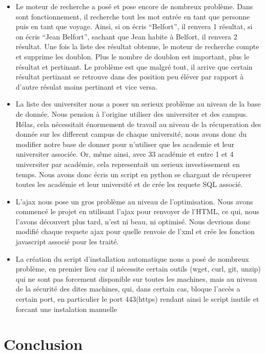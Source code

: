 \documentclass[a4paper,10pt]{report}
\begin{document}
\begin{itemize}
    \item Le moteur de recherche a pos\'e et pose encore de nombreux probl\`eme.
    Dans sont fonctionnement, il recherche tout les mot entr\'ee en tant que
    personne puis en tant que voyage. Ainsi, si on \'ecris ``Belfort'', il renvera 1 r\'esultat,
    si on \'ecris ``Jean Belfort'', sachant que Jean habite \`a Belfort, il renvera 2 r\'esultat.
    Une fois la liste des r\'esultat obtenue, le moteur de recherche compte et supprime
    les doublon. Plus le nombre de doublon est important, plus le r\'esultat et pertinant.
    Le probl\`eme est que malgr\'e tout, il arrive que certain r\'esultat pertinant se
    retrouve dans des position peu \'el\'ever par rapport \`a d'autre r\'esulat moins pertinant
    et vice versa.
    
    \null
    
    \item La liste des universiter nous a poser un serieux probl\`eme au niveau de la
    base de donn\'ee. Nous pension \`a l'origine utiliser des universiter et des campus.
    H\'elas, cela n\'ecessitait \'enormement de travail au niveau de la r\'ecuperation
    des donn\'ee sur les different campus de chaque universit\'e, nous avons donc du
    modifier notre base de donner pour n'utiliser que les academie et leur universiter
    associ\'ee. Or, m\^eme ainsi, avec 33 acad\'emie et entre 1 et 4 universiter par
    acad\'emie, cela representait un serieux investissement en temps. Nous avons donc
    \'ecris un script en python se chargant de r\'ecuperer toutes les acad\'emie et
    leur universit\'e et de cr\'ee les requete SQL associ\'e.
    
    \null
    
    \item L'ajax nous pose un gros probl\`eme au niveau de l'optimisation. Nous avons
    commenc\'e le projet en utilisant l'ajax pour renvoyer de l'HTML, ce qui, nous l'avons
    d\'ecouvert plus tard, n'est ni beau, ni optimis\'e. Nous devrions donc modifi\'e
    chaque requete ajax pour quelle renvoie de l'xml et cr\'ee les fonction javascript
    associ\'e pour les trait\'e.

    \null
    
    \item La cr\'eation du script d'installation automatique nous a pos\'e de nombreux
    probl\`eme, en premier lieu car il n\'ecessite certain outils (wget, curl, git, unzip)
    qui ne sont pas forcement disponible sur toutes les machines, mais au niveau de la
    s\'ecurit\'e des dites machines, qui, dans certain cas, bloque l'accès a certain port, en
    particulier le port 443(https) rendant ainsi le script inutile et forcant une instalation
    manuelle
\end{itemize}

\chapter*{Conclusion}
\end{document}
